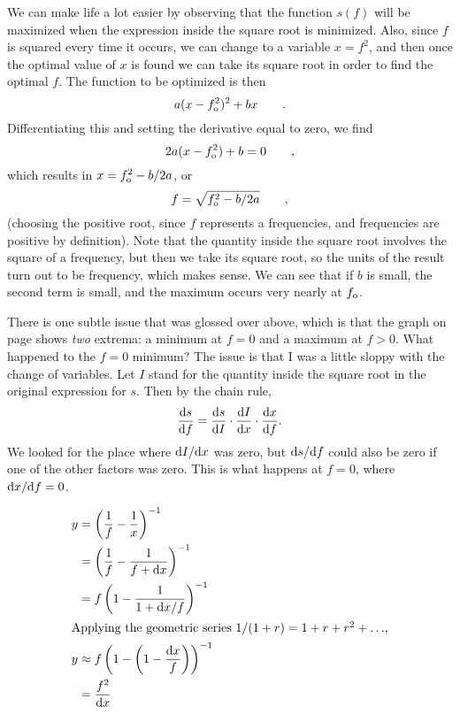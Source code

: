 
We can make life a lot easier by observing that the function $s(f)$ will be maximized when the
expression inside the square root is minimized. Also, since $f$ is squared every time it occurs,
we can change to a variable $x=f^2$,
and then once the optimal value of $x$ is found we can take its square root in order to find
the optimal $f$. The function to be optimized is then
\begin{equation*}
  a(x-f_{\textup{o}}^2)^2+bx \qquad .
\end{equation*}
Differentiating this and setting the derivative equal to zero, we find
\begin{equation*}
  2a(x-f_{\textup{o}}^2)+b = 0 \qquad,
\end{equation*}
which results in $x=f_{\textup{o}}^2-b/2a$, or
\begin{equation*}
  f = \sqrt{f_{\textup{o}}^2-b/2a} \qquad,
\end{equation*}
(choosing the positive root, since $f$ represents a frequencies, and frequencies are positive by definition).
Note that the quantity inside the square root involves the square of a frequency, but then we take its
square root, so the units of the result turn out to be frequency, which makes sense. We can see that
if $b$ is small, the second term is small, and the maximum occurs very nearly at
$f_{\textup{o}}$. 

There is one subtle issue that was glossed over above, which is that the graph on page \pageref{fig:resonance}
shows \emph{two} extrema: a minimum at $f=0$ and a maximum at $f>0$. What happened to the $f=0$ minimum?
The issue is that I was a little sloppy with the change of variables. Let $I$ stand for the quantity inside
the square root in the original expression for $s$. Then by the chain rule,
\begin{equation*}
  \frac{\textup{d} s}{\textup{d} f} =   \frac{\textup{d} s}{\textup{d} I} \cdot \frac{\textup{d} I}{\textup{d} x} \cdot \frac{\textup{d} x}{\textup{d} f} .
\end{equation*}
We looked for the place where $\textup{d} I/\textup{d} x$ was zero, but $\textup{d} s/\textup{d} f$ could also be zero if one of the
other factors was zero. This is what happens at $f=0$, where $\textup{d} x/\textup{d} f=0$.


\begin{align*}
  y &= \left(\frac{1}{f}-\frac{1}{x}\right)^{-1} \\
    &= \left(\frac{1}{f}-\frac{1}{f+\textup{d} x}\right)^{-1} \\
    &= f\left(1-\frac{1}{1+\textup{d} x/f}\right)^{-1} \\
\intertext{Applying the geometric series $1/(1+r)=1+r+r^2+\ldots$,}
  y &\approx f\left(1-\left(1-\frac{\textup{d} x}{f}\right)\right)^{-1} \\
    &= \frac{f^2}{\textup{d} x} 
\end{align*}

